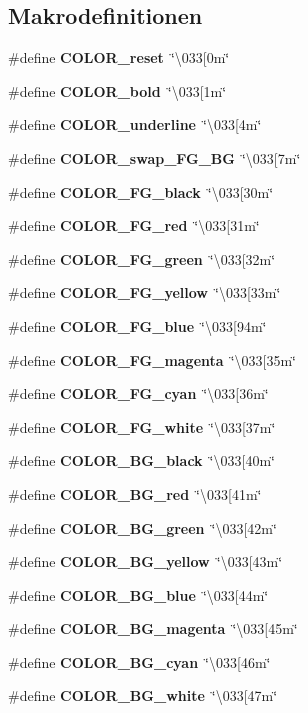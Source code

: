 \subsection*{Makrodefinitionen}
\begin{DoxyCompactItemize}
\item 
\#define \textbf{ C\+O\+L\+O\+R\+\_\+reset}~\char`\"{}\textbackslash{}033[0m\char`\"{}
\item 
\#define \textbf{ C\+O\+L\+O\+R\+\_\+bold}~\char`\"{}\textbackslash{}033[1m\char`\"{}
\item 
\#define \textbf{ C\+O\+L\+O\+R\+\_\+underline}~\char`\"{}\textbackslash{}033[4m\char`\"{}
\item 
\#define \textbf{ C\+O\+L\+O\+R\+\_\+swap\+\_\+\+F\+G\+\_\+\+BG}~\char`\"{}\textbackslash{}033[7m\char`\"{}
\item 
\#define \textbf{ C\+O\+L\+O\+R\+\_\+\+F\+G\+\_\+black}~\char`\"{}\textbackslash{}033[30m\char`\"{}
\item 
\#define \textbf{ C\+O\+L\+O\+R\+\_\+\+F\+G\+\_\+red}~\char`\"{}\textbackslash{}033[31m\char`\"{}
\item 
\#define \textbf{ C\+O\+L\+O\+R\+\_\+\+F\+G\+\_\+green}~\char`\"{}\textbackslash{}033[32m\char`\"{}
\item 
\#define \textbf{ C\+O\+L\+O\+R\+\_\+\+F\+G\+\_\+yellow}~\char`\"{}\textbackslash{}033[33m\char`\"{}
\item 
\#define \textbf{ C\+O\+L\+O\+R\+\_\+\+F\+G\+\_\+blue}~\char`\"{}\textbackslash{}033[94m\char`\"{}
\item 
\#define \textbf{ C\+O\+L\+O\+R\+\_\+\+F\+G\+\_\+magenta}~\char`\"{}\textbackslash{}033[35m\char`\"{}
\item 
\#define \textbf{ C\+O\+L\+O\+R\+\_\+\+F\+G\+\_\+cyan}~\char`\"{}\textbackslash{}033[36m\char`\"{}
\item 
\#define \textbf{ C\+O\+L\+O\+R\+\_\+\+F\+G\+\_\+white}~\char`\"{}\textbackslash{}033[37m\char`\"{}
\item 
\#define \textbf{ C\+O\+L\+O\+R\+\_\+\+B\+G\+\_\+black}~\char`\"{}\textbackslash{}033[40m\char`\"{}
\item 
\#define \textbf{ C\+O\+L\+O\+R\+\_\+\+B\+G\+\_\+red}~\char`\"{}\textbackslash{}033[41m\char`\"{}
\item 
\#define \textbf{ C\+O\+L\+O\+R\+\_\+\+B\+G\+\_\+green}~\char`\"{}\textbackslash{}033[42m\char`\"{}
\item 
\#define \textbf{ C\+O\+L\+O\+R\+\_\+\+B\+G\+\_\+yellow}~\char`\"{}\textbackslash{}033[43m\char`\"{}
\item 
\#define \textbf{ C\+O\+L\+O\+R\+\_\+\+B\+G\+\_\+blue}~\char`\"{}\textbackslash{}033[44m\char`\"{}
\item 
\#define \textbf{ C\+O\+L\+O\+R\+\_\+\+B\+G\+\_\+magenta}~\char`\"{}\textbackslash{}033[45m\char`\"{}
\item 
\#define \textbf{ C\+O\+L\+O\+R\+\_\+\+B\+G\+\_\+cyan}~\char`\"{}\textbackslash{}033[46m\char`\"{}
\item 
\#define \textbf{ C\+O\+L\+O\+R\+\_\+\+B\+G\+\_\+white}~\char`\"{}\textbackslash{}033[47m\char`\"{}
\end{DoxyCompactItemize}


